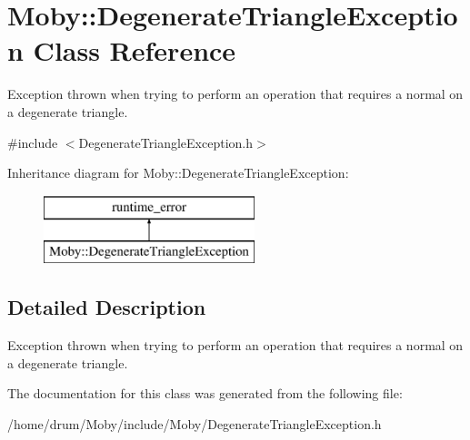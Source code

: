 \section{Moby\-:\-:Degenerate\-Triangle\-Exception Class Reference}
\label{classMoby_1_1DegenerateTriangleException}


Exception thrown when trying to perform an operation that requires a normal on a degenerate triangle.  




{\ttfamily \#include $<$Degenerate\-Triangle\-Exception.\-h$>$}

Inheritance diagram for Moby\-:\-:Degenerate\-Triangle\-Exception\-:\begin{figure}[H]
\begin{center}
\leavevmode
\includegraphics[height=2.000000cm]{classMoby_1_1DegenerateTriangleException}
\end{center}
\end{figure}


\subsection{Detailed Description}
Exception thrown when trying to perform an operation that requires a normal on a degenerate triangle. 

The documentation for this class was generated from the following file\-:\begin{DoxyCompactItemize}
\item 
/home/drum/\-Moby/include/\-Moby/Degenerate\-Triangle\-Exception.\-h\end{DoxyCompactItemize}
